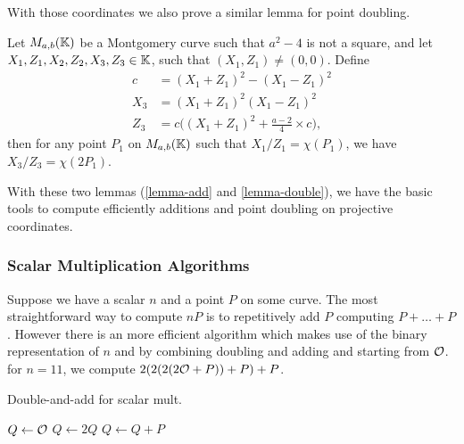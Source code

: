 With those coordinates we also prove a similar lemma for point doubling.
\begin{lemma}
\label{lemma-double}
Let $M_{a,b}(\mathbb{K})$ be a Montgomery curve such that $a^2-4$ is not a square, and let $X_1, Z_1, X_2, Z_2, X_3, Z_3 \in \mathbb{K}$, such that $(X_1,Z_1) \neq (0,0)$. Define
\begin{align*}
  c &= (X_1 + Z_1)^2 - (X_1 - Z_1)^2\\
X_3 &= (X_1 + Z_1)^2(X_1-Z_1)^2\\
Z_3 &= c\Big((X_1 + Z_1)^2+\frac{a-2}{4}\times c\Big),
\end{align*}
then for any point $P_1$ on $M_{a,b}(\mathbb{K})$ such that $X_1/Z_1 = \chi(P_1)$, we have $X_3/Z_3 = \chi(2P_1)$.
\end{lemma}

With these two lemmas (\ref{lemma-add} and \ref{lemma-double}), we have the basic tools to compute efficiently additions and point doubling on projective coordinates.

\subsubsection{Scalar Multiplication Algorithms}
\label{ladder}

Suppose we have a scalar $n$ and a point $P$ on some curve. The most straightforward way to compute $nP$ is to repetitively add $P$ \ie computing $P + \ldots + P$.
However there is an more efficient algorithm which makes use of the binary representation of $n$ and by combining doubling and adding and starting from $\mathcal{O}$.
\eg for $n=11$, we compute $2(2(2(2\mathcal{O} + P)) + P)+ P$.

\begin{algorithm}
\caption{Double-and-add for scalar mult.}
\label{double-add}
\begin{algorithmic}
\STATE $Q \leftarrow \mathcal{O}$
  \STATE $Q \leftarrow 2Q$
    \STATE $Q \leftarrow Q + P$
  \ENDIF
\ENDFOR
\end{algorithmic}
\end{algorithm}

